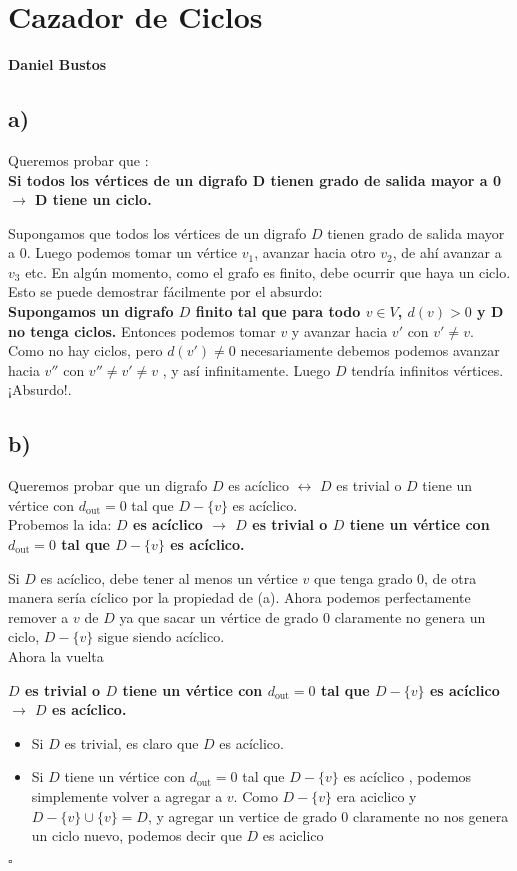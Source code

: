 \documentclass{article}
\begin{document}
\section*{Cazador de Ciclos}
\textbf{Daniel Bustos}

\subsection*{a)}
Queremos probar que : \\
\textbf{Si todos los vértices de un digrafo D tienen grado de salida mayor a 0 \(\rightarrow\) D tiene un ciclo.}

Supongamos que todos los vértices de un digrafo \(D\) tienen grado de salida mayor a 0.
Luego podemos tomar un vértice \(v_1\), avanzar hacia otro \(v_2\), de ahí avanzar a \(v_3\) etc.
En algún momento, como el grafo es finito, debe ocurrir que haya un ciclo. Esto se puede demostrar fácilmente por el absurdo:\\
\textbf{Supongamos un digrafo \(D\) finito tal que para todo \(v \in V\), \(d(v) > 0\) y D no tenga ciclos.}
Entonces podemos tomar \(v\) y avanzar hacia \(v'\) con \(v' \neq v\). Como no hay ciclos, pero \(d(v') \neq 0\) necesariamente debemos podemos avanzar hacia \(v''\) con \(v'' \neq v' \neq v\) , y así infinitamente.
Luego \(D\) tendría infinitos vértices. ¡Absurdo!.

\subsection*{b)}
Queremos probar que un digrafo \(D\) es acíclico \(\leftrightarrow\) \(D\) es trivial o \(D\) tiene un vértice con \(d_{\text{out}} = 0\) tal que \(D - \{v\}\) es acíclico.\\

Probemos la ida:
\textbf{\(D\) es acíclico \(\rightarrow\) \(D\) es trivial o \(D\) tiene un vértice con \(d_{\text{out}} = 0\) tal que \(D - \{v\}\) es acíclico.}

Si \(D\) es acíclico, debe tener al menos un vértice \(v\) que tenga grado \(0\), de otra manera sería cíclico por la propiedad de (a). Ahora
podemos perfectamente remover a \(v\) de \(D\) ya que sacar un vértice de grado \(0\) claramente no genera un ciclo, \(D - \{v\}\) sigue siendo acíclico.\\

Ahora la vuelta

\textbf{\(D\) es trivial o \(D\) tiene un vértice con \(d_{\text{out}} = 0\) tal que \(D - \{v\}\) es acíclico \(\rightarrow\) \(D\) es acíclico.}
\begin{itemize}

\item Si \(D\) es trivial, es claro que \(D\) es acíclico.

\item Si \(D\) tiene un vértice con \(d_{\text{out}} = 0\) tal que \(D - \{v\}\) es acíclico , podemos simplemente volver a agregar a \(v\). Como \(D - \{v\}\)  era aciclico y \(D - \{v\} \cup \{v\} = D \), y agregar un vertice de grado 0 claramente no nos genera un ciclo nuevo, podemos decir que \(D\) es aciclico 
\end{itemize}
$\square$
\end{document}
